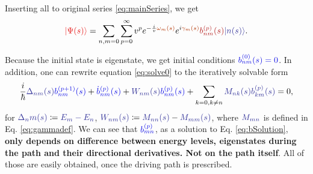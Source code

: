 Inserting all to original series \ref{eq:mainSeries}, we get
\begin{equation}
    \red{\ket{\Psi(s)}}=\sum_{n,m=0}\sum_{p=0}^\infty v^p e^{-\frac{i}{v}\reddd{\omega_m(s)}}e^{i\reddd{\gamma_m(s)}}\redd{b_{nm}^{(p)}(s)}\bluee{\ket{n(s)}}.
    \label{eq:solve0}
\end{equation}

Because the initial state is eigenstate, we get initial conditions $\blue{b_{nm}^{(0)}(s)=0}$. In addition, one can rewrite equation \ref{eq:solve0} to the iteratively solvable form
\begin{equation}
    \frac{i}{\hbar}\bluee{\Delta_{nm}(s)}\blue{b_{nm}^{(p+1)}(s)}+\blue{\dot b_{nm}^{(p)}(s)}+\bluee{W_{nm}(s)} \blue{b_{nm}^{(p)}(s)}+\sum_{k=0,k\neq n}\bluee{M_{nk}(s)}\bluee{b_{km}^{(p)}(s)}=0,
    \label{eq:bSolution}
\end{equation}
for $\bluee{\Delta_nm(s)}\coloneqq \bluee{E_m-E_n}$, $\bluee{W_{nm}(s)}\coloneqq \bluee{M_{nn}(s)}-\bluee{M_{mm}(s)}$, where $\bluee{M_{mn}}$ is defined in Eq. \ref{eq:gammadef}. We can see that $\blue{b_{mn}^{(p)}}$, as a solution to Eq. \ref{eq:bSolution},\textbf{ only depends on difference between energy levels, eigenstates during the path and their directional derivatives. Not on the path itself}. All of those are easily obtained, once the driving path is prescribed.

    